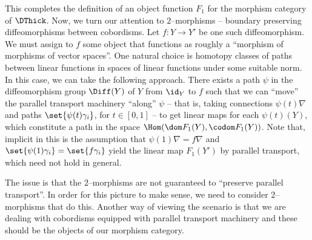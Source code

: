 \documentclass[\PRJWD/Thick_TQFTs_and_Quantum_Information.tex]{subfiles}
\begin{document}
This completes the definition of an object function $F_1$ for the morphism
category of $\DThick$. Now, we turn our attention to $2$--morphisms -- boundary
preserving diffeomorphisms between cobordisms. Let $f : Y \to Y'$ be one such
diffeomorphism. We must assign to $f$ some object that functions as roughly a
``morphism of morphisms of vector spaces''. One natural choice is homotopy
classes of paths between linear functions in spaces of linear functions under
some suitable norm. In this case, we can take the following approach. There
exists a path $\psi$ in the diffeomorphism group $\Diff(Y)$ of $Y$ from $\id_Y$
to $f$ such that we can ``move'' the parallel transport machinery ``along''
$\psi$ -- that is, taking connections $\psi(t)\nabla$ and paths
$\set{\psi(t)\gamma_i}$, for $t \in [0, 1]$ -- to get linear maps for each
$\psi(t)(Y)$, which constitute a path in the space $\Hom(\dom F_1(Y), \codom
F_1(Y))$. Note that, implicit in this is the assumption that
$\psi(1)\nabla = f\nabla$ and $\set{\psi(1)\gamma_i} = \set{f\gamma_i}$ yield
the linear map $F_1(Y')$ by parallel transport, which need not hold in general.

The issue is that the $2$--morphisms are not guaranteed to ``preserve parallel
transport''. In order for this picture to make sense, we need to consider
$2$--morphisms that do this. Another way of viewing the scenario is that we are
dealing with cobordisms equipped with parallel transport machinery and these
should be the objects of our morphism category.
\end{document}
